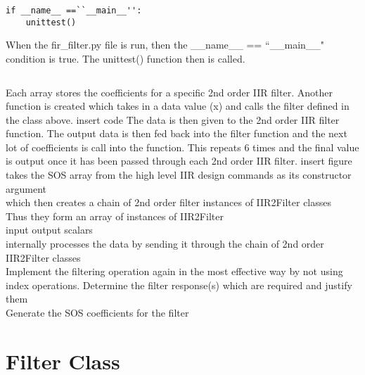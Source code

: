 \documentclass{article}
\begin{document}
\lstset{language=Python}
\begin{lstlisting}
if __name__ ==``__main__'':
    unittest()
\end{lstlisting}
When the fir\_filter.py file is run, then the \_\_name\_\_ == ``\_\_main\_\_" condition is true. The unittest() function then is called.
\lstset{language=Python}
\begin{lstlisting}

\end{lstlisting}
Each array stores the coefficients for a specific 2nd order IIR filter. Another function is created which takes in a data value (x) and calls the filter defined in the class above.
\newline 
\newline
insert code 
\newline
\newline
The data is then given to the 2nd order IIR filter function. The output data is then fed back into the filter function and the next lot of coefficients is call into the function. This repeats 6 times and the final value is output once it has been passed through each 2nd order IIR filter. 
\newline
\newline 
insert figure 
\newline
\newline
takes the SOS array from the high level IIR design commands as its constructor argument\\
which then creates a chain of 2nd order filter instances of IIR2Filter classes\\
Thus they form an array of instances of IIR2Filter\\
input output scalars\\
internally processes the data by sending it through the chain of 2nd order IIR2Filter classes\\
Implement the filtering operation again in the most effective way by not using index operations.
Determine the filter response(s) which are required and justify them\\
Generate the SOS coefficients for the filter
\section{Filter Class}
\end{document}

